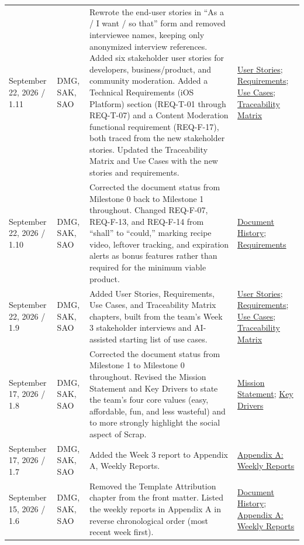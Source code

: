 \begin{tabularx}{\linewidth}{L{2.7cm}L{2.0cm}YL{2.4cm}}
September 22, 2026 / 1.11 & DMG, SAK, SAO & Rewrote the end-user stories in ``As a / I want / so that'' form and removed interviewee names, keeping only anonymized interview references. Added six stakeholder user stories for developers, business/product, and community moderation. Added a Technical Requirements (iOS Platform) section (REQ-T-01 through REQ-T-07) and a Content Moderation functional requirement (REQ-F-17), both traced from the new stakeholder stories. Updated the Traceability Matrix and Use Cases with the new stories and requirements. & \hyperref[Chapter:UserStories]{User Stories}; \hyperref[Chapter:Requirements]{Requirements}; \hyperref[Chapter:UseCases]{Use Cases}; \hyperref[Chapter:Traceability]{Traceability Matrix}\\
September 22, 2026 / 1.10 & DMG, SAK, SAO & Corrected the document status from Milestone 0 back to Milestone 1 throughout. Changed REQ-F-07, REQ-F-13, and REQ-F-14 from ``shall'' to ``could,'' marking recipe video, leftover tracking, and expiration alerts as bonus features rather than required for the minimum viable product. & \hyperref[Chapter:DocumentHistory]{Document History}; \hyperref[Chapter:Requirements]{Requirements}\\
September 22, 2026 / 1.9 & DMG, SAK, SAO & Added User Stories, Requirements, Use Cases, and Traceability Matrix chapters, built from the team's Week 3 stakeholder interviews and AI-assisted starting list of use cases. & \hyperref[Chapter:UserStories]{User Stories}; \hyperref[Chapter:Requirements]{Requirements}; \hyperref[Chapter:UseCases]{Use Cases}; \hyperref[Chapter:Traceability]{Traceability Matrix}\\
September 17, 2026 / 1.8 & DMG, SAK, SAO & Corrected the document status from Milestone 1 to Milestone 0 throughout. Revised the Mission Statement and Key Drivers to state the team's four core values (easy, affordable, fun, and less wasteful) and to more strongly highlight the social aspect of Scrap. & \hyperref[Chapter:MissionStatement]{Mission Statement}; \hyperref[Chapter:KeyDrivers]{Key Drivers}\\
September 17, 2026 / 1.7 & DMG, SAK, SAO & Added the Week 3 report to Appendix A, Weekly Reports. & \hyperref[Chapter:WeeklyReports]{Appendix A: Weekly Reports}\\
September 15, 2026 / 1.6 & DMG, SAK, SAO & Removed the Template Attribution chapter from the front matter. Listed the weekly reports in Appendix A in reverse chronological order (most recent week first). & \hyperref[Chapter:DocumentHistory]{Document History}; \hyperref[Chapter:WeeklyReports]{Appendix A: Weekly Reports}\\

\end{tabularx}
